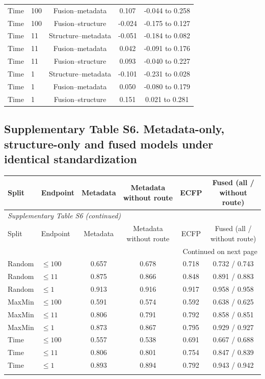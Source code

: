 \begin{longtable}{llccc}
Time & 100 & Fusion--metadata & 0.107 & -0.044 to 0.258 \\
Time & 100 & Fusion--structure & -0.024 & -0.175 to 0.127 \\
Time & 11 & Structure--metadata & -0.051 & -0.184 to 0.082 \\
Time & 11 & Fusion--metadata & 0.042 & -0.091 to 0.176 \\
Time & 11 & Fusion--structure & 0.093 & -0.040 to 0.227 \\
Time & 1 & Structure--metadata & -0.101 & -0.231 to 0.028 \\
Time & 1 & Fusion--metadata & 0.050 & -0.080 to 0.179 \\
Time & 1 & Fusion--structure & 0.151 & 0.021 to 0.281 \\
\end{longtable}

\subsection*{Supplementary Table S6. Metadata-only, structure-only and fused models under identical standardization}
\begin{longtable}{llcccc}

\toprule Split & Endpoint & Metadata & Metadata without route & ECFP & Fused (all / without route) \\ \midrule\endfirsthead
\multicolumn{6}{l}{\textit{Supplementary Table S6 (continued)}} \\
\toprule Split & Endpoint & Metadata & Metadata without route & ECFP & Fused (all / without route) \\ \midrule\endhead
\midrule\multicolumn{6}{r}{Continued on next page}\\\endfoot
\bottomrule\endlastfoot
Random & $\leq100$ & 0.657 & 0.678 & 0.718 & 0.732 / 0.743 \\
Random & $\leq11$ & 0.875 & 0.866 & 0.848 & 0.891 / 0.883 \\
Random & $\leq1$ & 0.913 & 0.916 & 0.917 & 0.958 / 0.958 \\
\addlinespace
MaxMin & $\leq100$ & 0.591 & 0.574 & 0.592 & 0.638 / 0.625 \\
MaxMin & $\leq11$ & 0.806 & 0.791 & 0.792 & 0.858 / 0.851 \\
MaxMin & $\leq1$ & 0.873 & 0.867 & 0.795 & 0.929 / 0.927 \\
\addlinespace
Time & $\leq100$ & 0.557 & 0.538 & 0.691 & 0.667 / 0.688 \\
Time & $\leq11$ & 0.806 & 0.801 & 0.754 & 0.847 / 0.839 \\
Time & $\leq1$ & 0.893 & 0.894 & 0.792 & 0.943 / 0.942 \\
\addlinespace
\end{longtable}

